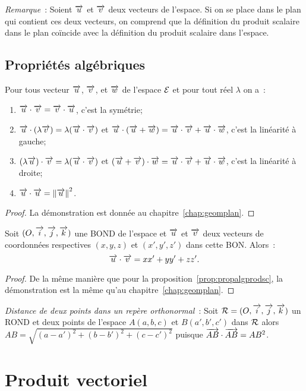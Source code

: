 \emph{Remarque}~: Soient $\overrightarrow{u}$ et $\overrightarrow{v}$ deux vecteurs de l'espace. Si on se place dans le plan qui contient ces deux vecteurs, on comprend que la définition du produit scalaire dans le plan coïncide avec la définition du produit scalaire dans l'espace.

\subsection{Propriétés algébriques}
\begin{prop}
  \label{prop:propalgprodsc}
  Pour tous vecteur $\overrightarrow{u}$, $\overrightarrow{v}$, et $\overrightarrow{w}$ de l'espace $\mathcal{E}$ et pour tout réel $\lambda$ on a~:
  \begin{enumerate}
  \item $\overrightarrow{u}\cdot\overrightarrow{v}=\overrightarrow{v}\cdot\overrightarrow{u}$, c'est la symétrie;
  \item $\overrightarrow{u}\cdot(\lambda\overrightarrow{v})=\lambda(\overrightarrow{u}\cdot\overrightarrow{v})$ et $\overrightarrow{u}\cdot(\overrightarrow{u}+\overrightarrow{w})=\overrightarrow{u}\cdot\overrightarrow{v}+\overrightarrow{u}\cdot\overrightarrow{w}$, c'est la linéarité à gauche;
    \item $(\lambda\overrightarrow{u})\cdot\overrightarrow{v}=\lambda(\overrightarrow{u}\cdot\overrightarrow{v})$ et $(\overrightarrow{u}+\overrightarrow{v})\cdot\overrightarrow{w}=\overrightarrow{u}\cdot\overrightarrow{v}+\overrightarrow{u}\cdot\overrightarrow{w}$, c'est la linéarité à droite;
    \item $\overrightarrow{u}\cdot\overrightarrow{u}=\left\lVert\overrightarrow{u}\right\rVert^2$.
  \end{enumerate}
\end{prop}
\begin{proof}
  La démonstration est donnée au chapitre~\ref{chap:geomplan}.
\end{proof}
\begin{prop}
  Soit $(O,\overrightarrow{i},\overrightarrow{j},\overrightarrow{k})$ une BOND de l'espace et $\overrightarrow{u}$ et $\overrightarrow{v}$ deux vecteurs de coordonnées respectives $(x,y,z)$ et $(x',y',z')$ dans cette BON\@. Alors~:
  \begin{equation}
    \overrightarrow{u}\cdot\overrightarrow{v}=xx'+yy'+zz'.
  \end{equation}
\end{prop}
\begin{proof}
  De la même manière que pour la proposition~\ref{prop:propalgprodsc}, la démonstration est la même qu'au chapitre~\ref{chap:geomplan}.
\end{proof}

\emph{Distance de deux points dans un repère orthonormal}~: Soit $\mathcal{R}=(O,\overrightarrow{i},\overrightarrow{j},\overrightarrow{k})$ un ROND et deux points de l'espace $A(a,b,c)$ et $B(a',b',c')$ dans $\mathcal{R}$ alors $AB=\sqrt{(a-a')^2+(b-b')^2+(c-c')^2}$ puisque $\overrightarrow{AB}\cdot\overrightarrow{AB}=AB^2$.

\section{Produit vectoriel}
\label{sec:prodvec}
